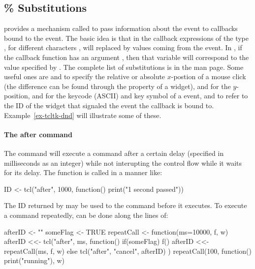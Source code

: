 \subsection{\% Substitutions}
\label{sec:tcltk-percent-substitutions}
\TK\/ provides a mechanism called  to pass
information about the event to callbacks bound to the event. The basic
idea is that in the \TCL\/ callback expressions of the type
, for different characters , will replaced by values
coming from the event. In , if the callback function has an
argument , then that variable will correspond to the value
specified by . The complete list of substitutions is in the
 man page. Some useful ones are  and  to
specify the relative or absolute $x$-postion of a mouse click (the
difference can be found through the  property of a
widget),  and  for the $y$-position,  and
 for the keycode (ASCII) and key symbol of a 
event, and  to refer to the ID of the widget that signaled the
event the callback is bound to. Example~\ref{ex-tcltk-dnd} will
illustrate some of these.

\paragraph{The after command}
The \TCL\/ command  will execute a command after a certain
delay (specified in milliseconds as an integer) while not interupting
the control flow while it waits for its delay. The function is called
in a manner like:
\begin{Schunk}
  \begin{Sinput}
    ID <- tcl("after", 1000, function() print("1 second passed"))    
  \end{Sinput}
\end{Schunk}
The ID returned by  may be used to  the
command before it executes. To execute a command repeatedly, can be
done along the lines of:
\begin{Schunk}
\begin{Sinput}
 afterID <- ""
 someFlag <- TRUE
 repeatCall <- function(ms=10000, f, w) {
   afterID <<- tcl("after", ms, function() {
     if(someFlag) {                      
       f()
       afterID <<- repeatCall(ms, f, w)
     }  else {
       tcl("after", "cancel", afterID)
     }
   })
 }
 repeatCall(100, function() print("running"), w)
\end{Sinput}
\end{Schunk}
%


